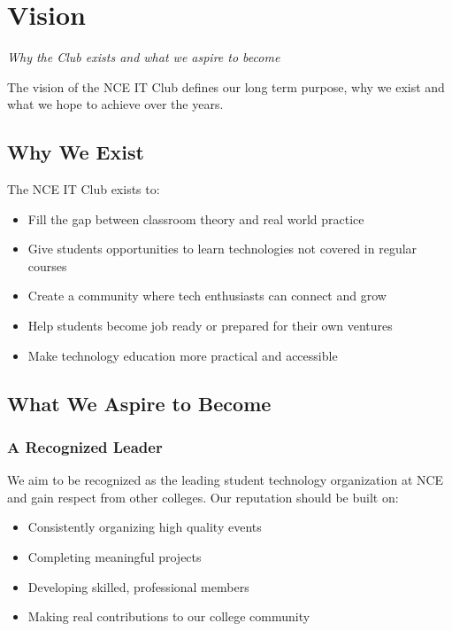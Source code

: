 {}
\section*{Vision}

\textit{Why the Club exists and what we aspire to become}

\vspace{0.5cm}

The vision of the NCE IT Club defines our long term purpose, why we exist and what we hope to achieve over the years.

\subsection*{Why We Exist}

The NCE IT Club exists to:

\begin{itemize}[leftmargin=2em, itemsep=0.3em]
    \item Fill the gap between classroom theory and real world practice
    \item Give students opportunities to learn technologies not covered in regular courses
    \item Create a community where tech enthusiasts can connect and grow
    \item Help students become job ready or prepared for their own ventures
    \item Make technology education more practical and accessible
\end{itemize}

\subsection*{What We Aspire to Become}

\subsubsection*{A Recognized Leader}

We aim to be recognized as the leading student technology organization at NCE and gain respect from other colleges. Our reputation should be built on:

\begin{itemize}[leftmargin=2em, itemsep=0.3em]
    \item Consistently organizing high quality events
    \item Completing meaningful projects
    \item Developing skilled, professional members
    \item Making real contributions to our college community
\end{itemize}

